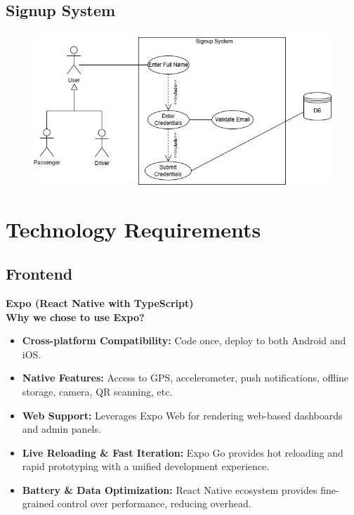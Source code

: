 \documentclass[a4paper,12pt]{article}
\begin{document}
  \subsection*{Signup System}
    \begin{figure}[H]
      \centering
      \includegraphics[width=1\textwidth]{Signup System.jpg} 
    \end{figure}
 

\section{Technology Requirements}

\subsection{Frontend}
\textbf{Expo (React Native with TypeScript)}\\
\textbf{Why we chose to use Expo?}
\begin{itemize}
    \item \textbf{Cross-platform Compatibility:} Code once, deploy to both Android and iOS.
    \item \textbf{Native Features:} Access to GPS, accelerometer, push notifications, offline storage, camera, QR scanning, etc.
    \item \textbf{Web Support:} Leverages Expo Web for rendering web-based dashboards and admin panels.
    \item \textbf{Live Reloading \& Fast Iteration:} Expo Go provides hot reloading and rapid prototyping with a unified development experience.
    \item \textbf{Battery \& Data Optimization:} React Native ecosystem provides fine-grained control over performance, reducing overhead.
\end{itemize}
\end{document}

